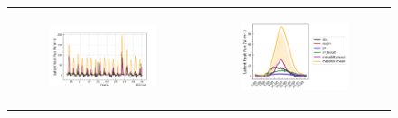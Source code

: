 \begin{figure}[hbtp]
    \centering
    \begin{tabular}{cc}
        \begin{subfigure}[t]{0.5\textwidth}
            \caption{}
            \includegraphics[width=\textwidth]{images/chap5/SOP_TS_DC/time_series_elsplans_flat.png}
        \end{subfigure} &
        \begin{subfigure}[t]{0.5\textwidth}
            \caption{}
            \includegraphics[width=\textwidth]{images/chap5/SOP_TS_DC/diurnal_cycle_elsplans_flat.png}
        \end{subfigure} \\
        

\end{tabular}
\end{figure}
